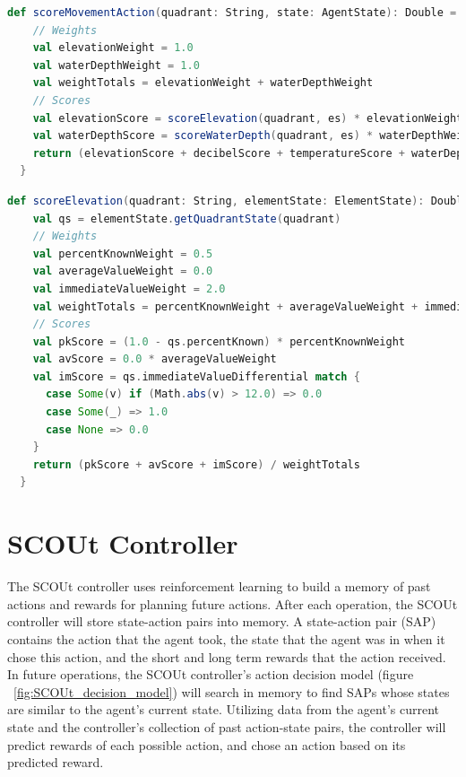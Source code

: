 \begin{lstlisting}[language=Scala, label=code:mapWater_scoreMovementAction]
  def scoreMovementAction(quadrant: String, state: AgentState): Double = {
    // Weights
    val elevationWeight = 1.0
    val waterDepthWeight = 1.0
    val weightTotals = elevationWeight + waterDepthWeight
    // Scores
    val elevationScore = scoreElevation(quadrant, es) * elevationWeight
    val waterDepthScore = scoreWaterDepth(quadrant, es) * waterDepthWeight
    return (elevationScore + decibelScore + temperatureScore + waterDepthScore) / weightTotals
  }
\end{lstlisting}

\begin{lstlisting}[language=Scala, label=code:findHuman_scoreElevation]
  def scoreElevation(quadrant: String, elementState: ElementState): Double = {
    val qs = elementState.getQuadrantState(quadrant)
    // Weights
    val percentKnownWeight = 0.5
    val averageValueWeight = 0.0
    val immediateValueWeight = 2.0
    val weightTotals = percentKnownWeight + averageValueWeight + immediateValueWeight
    // Scores
    val pkScore = (1.0 - qs.percentKnown) * percentKnownWeight
    val avScore = 0.0 * averageValueWeight
    val imScore = qs.immediateValueDifferential match {
      case Some(v) if (Math.abs(v) > 12.0) => 0.0
      case Some(_) => 1.0
      case None => 0.0
    }
    return (pkScore + avScore + imScore) / weightTotals
  }
\end{lstlisting}


\section{SCOUt Controller}
The SCOUt controller uses reinforcement learning to build a memory of past actions and rewards for planning future actions.
After each operation, the SCOUt controller will store state-action pairs into memory.
A state-action pair (SAP) contains the action that the agent took, the state that the agent was in when it chose this action, and the short and long term rewards that the action received.
In future operations, the SCOUt controller's action decision model (figure ~\ref{fig:SCOUt_decision_model}) will search in memory to find SAPs whose states are similar to the agent's current state.
Utilizing data from the agent's current state and the controller's collection of past action-state pairs, the controller will predict rewards of each possible action, and chose an action based on its predicted reward.

